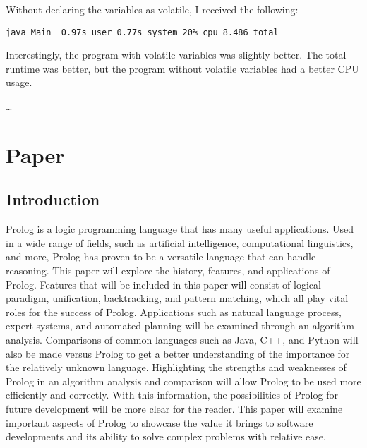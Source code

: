 \documentclass{article}
\theoremstyle{theorem}
\theoremstyle{definition}
\theoremstyle{remark}
\begin{document}
\noindent\newline Without declaring the variables as volatile, I received the following:
\begin{verbatim}
java Main  0.97s user 0.77s system 20% cpu 8.486 total
\end{verbatim}

\noindent\newline\newline Interestingly, the program with volatile variables was slightly better. The total runtime was better, but the program without volatile variables had a better CPU usage.


\dots

\section{Paper}
\subsection{Introduction}

Prolog is a logic programming language that has many useful applications. Used in a wide range of fields, such as artificial intelligence, computational linguistics, and more, Prolog has proven to be a versatile language that can handle reasoning. This paper will explore the history, features, and applications of Prolog. Features that will be included in this paper will consist of logical paradigm, unification, backtracking, and pattern matching, which all play vital roles for the success of Prolog. Applications such as natural language process, expert systems, and automated planning will be examined through an algorithm analysis. Comparisons of common languages such as Java, C++, and Python will also be made versus Prolog to get a better understanding of the importance for the relatively unknown language. Highlighting the strengths and weaknesses of Prolog in an algorithm analysis and comparison will allow Prolog to be used more efficiently and correctly. With this information, the possibilities of Prolog for future development will be more clear for the reader. This paper will examine important aspects of Prolog to showcase the value it brings to software developments and its ability to solve complex problems with relative ease.\newline
\end{document}

